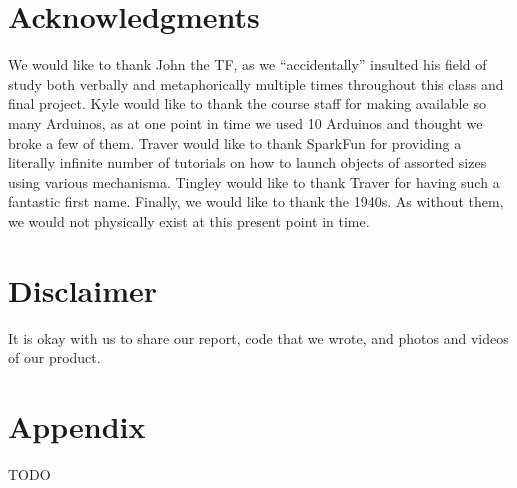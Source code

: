 \documentclass{es50report}
\begin{document}
    \section{Acknowledgments}
        We would like to thank John the TF, as we ``accidentally'' insulted his field of study both verbally and metaphorically multiple times throughout this class and final project. Kyle would like to thank the course staff for making available so many Arduinos, as at one point in time we used 10 Arduinos and thought we broke a few of them. Traver would like to thank SparkFun for providing a literally infinite number of tutorials on how to launch objects of assorted sizes using various mechanisma. Tingley would like to thank Traver for having such a fantastic first name. Finally, we would like to thank the 1940s. As without them, we would not physically exist at this present point in time.

    \section{Disclaimer}
        It is okay with us to share our report, code that we wrote, and photos and videos of our product.

    \appendix
    \section{Appendix}
    TODO

    \newpage
    
    
\end{document}
